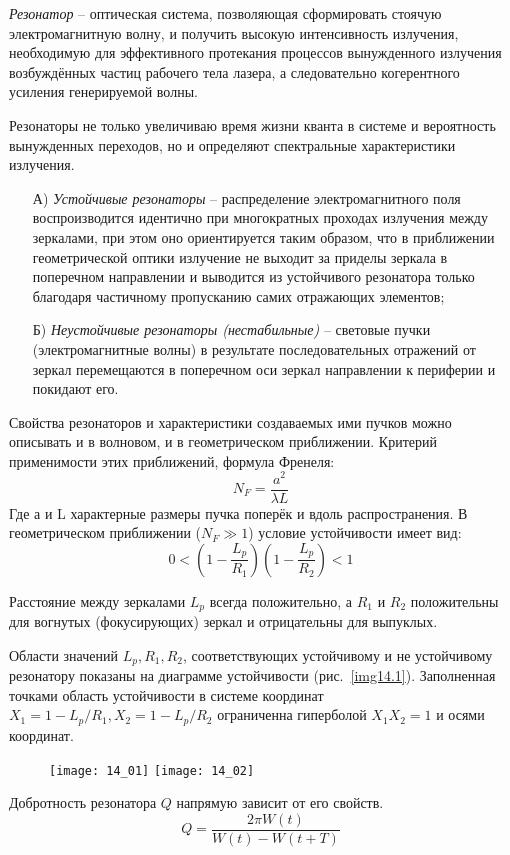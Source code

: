 
\emph{Резонатор} -- оптическая система, позволяющая сформировать стоячую
электромагнитную волну, и получить высокую интенсивность излучения,
необходимую для эффективного протекания процессов вынужденного излучения
возбуждённых частиц рабочего тела лазера, а следовательно когерентного
усиления генерируемой волны.

Резонаторы не только увеличиваю время жизни кванта в системе и вероятность
вынужденных переходов, но и определяют спектральные характеристики излучения.
\begin{enumerate}
    \item[А)] \emph{Устойчивые резонаторы} -- распределение электромагнитного поля
воспроизводится идентично при многократных проходах излучения между зеркалами,
при этом оно ориентируется таким образом, что в приближении геометрической
оптики излучение не выходит за приделы зеркала в поперечном направлении и
выводится из устойчивого резонатора только благодаря частичному пропусканию
самих отражающих элементов;
    \item[Б)] \emph{Неустойчивые резонаторы (нестабильные)} -- световые пучки
(электромагнитные волны) в результате последовательных отражений от зеркал
перемещаются в поперечном оси зеркал направлении к периферии и покидают его.
\end{enumerate}
Свойства резонаторов и характеристики создаваемых ими пучков можно описывать
и в волновом, и в геометрическом приближении. Критерий применимости этих
приближений, формула Френеля:
\[
    N_F = \frac{a^2}{\lambda L}
\]
Где а и L характерные размеры пучка поперёк и вдоль распространения.
В геометрическом приближении (\( N_F \gg 1 \)) условие устойчивости имеет вид:
\[
    0 < \left(1-\frac{L_p}{R_1}\right)\left(1-\frac{L_p}{R_2}\right) < 1
\]

Расстояние между зеркалами \( L_p \) всегда положительно, а \( R_1 \) и
\( R_2 \) положительны для вогнутых (фокусирующих) зеркал и отрицательны для
выпуклых.

Области значений \( L_p, R_1, R_2 \), соответствующих устойчивому и не
устойчивому резонатору показаны на диаграмме устойчивости
(рис.~\ref{img14.1}). Заполненная точками область устойчивости в системе
координат \( X_1 = 1-L_p/R_1, X_2 = 1-L_p/R_2 \) ограниченна гиперболой
\( X_1 X_2 = 1 \) и осями координат.
\begin{figure}[h!]
    \center
    \texttt{[image: 14\_01]} \hspace{1em}
    \texttt{[image: 14\_02]} \\
    \parbox{.4\textwidth}{\caption{} \label{img14.1}} \hspace{1em}
    \parbox{.4\textwidth}{\caption{} \label{img14.2}}
\end{figure}

Добротность резонатора \( Q \) напрямую зависит от его свойств.
\[
    Q = \frac{2\pi W(t)}{W(t)-W(t+T)}
\]
